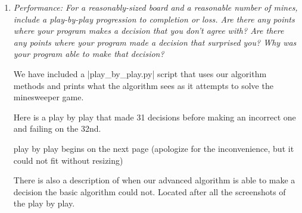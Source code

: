 \documentclass[12pt, twoside]{article}
\begin{document}
\begin{enumerate}[itemsep=2mm,parsep=4mm]
    \item 
        \textit{Performance: For a reasonably-sized board and a reasonable number of mines, include a play-by-play progression to completion or loss. Are there any points where your program makes a decision that you don’t agree with? Are there any points where your program made a decision that surprised you?  Why was your program able to make that decision?}

        We have included a \cverb|play_by_play.py| script that uses our algorithm methods and prints what the algorithm sees as it attempts to solve the minesweeper game.

        Here is a play by play that made 31 decisions before making an incorrect one and failing on the 32nd.

        play by play begins on the next page (apologize for the inconvenience, but it could not fit without resizing)

        There is also a description of when our advanced algorithm is able to make a decision the basic algorithm could not. Located after all the screenshots of the play by play.


\end{enumerate}
\end{document}
